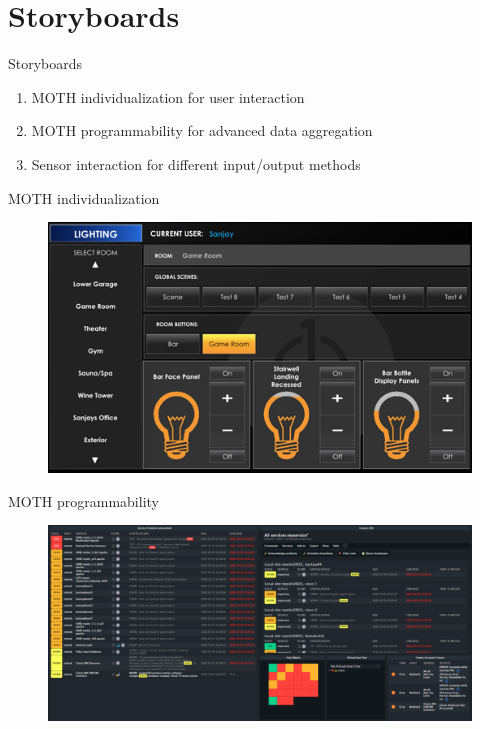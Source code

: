 \documentclass{beamer}
\begin{document}
    \section{Storyboards}
    \begin{frame}{Storyboards}
        \begin{enumerate}
            \item MOTH individualization for user interaction
            \item MOTH programmability for advanced data aggregation
            \item Sensor interaction for different input/output methods
        \end{enumerate}
    \end{frame}


    \begin{frame}{MOTH individualization}
        \begin{figure}[H]
            \centering
            \includegraphics[width=1\textwidth]{Storyboard_UserInterface.png}
            \label{fig:Storyboard_UserInterface}
        \end{figure}
    \end{frame}

    \begin{frame}{MOTH programmability}
        \begin{figure}[H]
            \centering
            \includegraphics[width=1\textwidth]{Storyboard_Programmability.png}
            \label{fig:Storyboard_Programmability}
        \end{figure}
    \end{frame}
\end{document}
